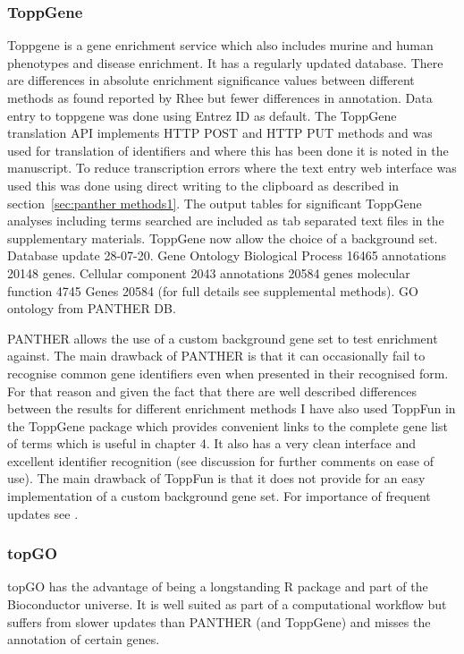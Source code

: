 \subsubsection{ToppGene}
\label{sec:ToppGene GO enrichment}
 Toppgene is a gene enrichment service which also includes murine and human phenotypes and disease enrichment\cite{chen2009toppgene}. It has a regularly updated database. There are differences in absolute enrichment significance values between different methods as found reported by Rhee \cite{rhee2008use} but fewer differences in annotation. Data entry to toppgene was done using Entrez ID as default. The ToppGene translation API implements  HTTP POST and HTTP PUT methods and was used for translation of identifiers and where this has been done it is noted in the manuscript. To reduce transcription errors where the text entry web interface was used this was done using direct writing to the clipboard as described in section~\ref{sec:panther methods1}. The output tables for significant ToppGene analyses including terms searched are included as tab separated text files  in the supplementary materials. ToppGene now allow the choice of a background set. Database update 28-07-20. Gene Ontology Biological Process 16465 annotations 20148 genes. Cellular component  2043 annotations 20584 genes molecular function 4745 Genes 20584 (for full details see supplemental methods). GO ontology from PANTHER DB.  
 
PANTHER allows the use of a custom background gene set to test enrichment against. The main drawback of PANTHER is that it can occasionally fail to recognise common gene identifiers even when presented in their recognised form. For that reason and given the fact that there are well described differences between the results for different enrichment methods I have also used ToppFun in the ToppGene package which provides convenient links to the complete gene list of terms which is useful in chapter 4. It also has a very clean interface and excellent identifier recognition (see discussion for further comments on ease of use). The main drawback of ToppFun is that it does not provide for an easy implementation of a custom background gene set. For importance of frequent updates see \cite{tomczak2018interpretation}.

\subsubsection{topGO}
\label{sec:toponto GO enrichment preliminary}
 topGO has the advantage of being a longstanding R package and part of the Bioconductor\cite{gentleman2004bioconductor} universe. It is well suited as part of a computational workflow but suffers from slower updates than PANTHER (and ToppGene) and misses the annotation of certain genes. 



